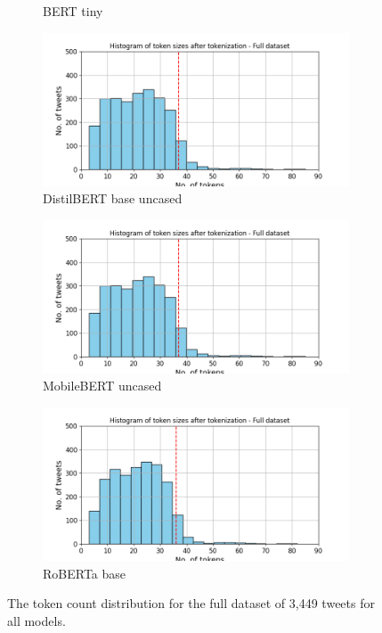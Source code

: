 \begin{figure}[htbp]
\begin{subfigure}[b]{0.48\textwidth}
        \caption{BERT tiny}
        \label{fig: token_pp_hist_tiny}
    \end{subfigure}
    \hfill
    \begin{subfigure}[b]{0.48\textwidth}
        \includegraphics[width=\textwidth]{figures/token_pp_hist_distilbert-base-uncased.png}
        \caption{DistilBERT base uncased}
        \label{fig: token_pp_hist_distilbert}
    \end{subfigure}
    \begin{subfigure}[b]{0.48\textwidth}
        \includegraphics[width=\textwidth]{figures/token_pp_hist_google-mobilebert-uncased.png}
        \caption{MobileBERT uncased}
        \label{fig: token_pp_hist_mobile}
    \end{subfigure}
    \hfill
    \begin{subfigure}[b]{0.48\textwidth}
        \includegraphics[width=\textwidth]{figures/token_pp_hist_roberta-base.png}
        \caption{RoBERTa base}
        \label{fig: token_pp_hist_roberta}
    \end{subfigure}
    \caption{The token count distribution for the full dataset of 3,449 tweets for all models.}
    \label{fig: apdxa_tokens}
\end{figure}




